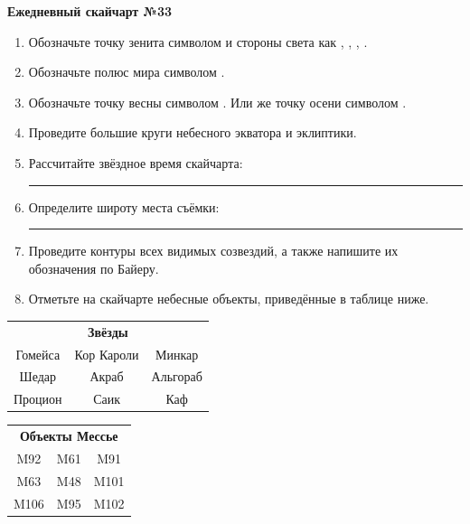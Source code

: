 \documentclass{./SAS-class-skygen}
\begin{document}
    
    
    
	\begin{center}
		\large\textbf{Ежедневный скайчарт №33}
	\end{center}

	\begin{enumerate}
		\item Обозначьте точку зенита символом  и стороны света как , , , .
		\item Обозначьте полюс мира символом .
		\item Обозначьте точку весны символом \Aries. Или же точку осени символом \Libra.
		\item Проведите большие круги небесного экватора и эклиптики.
		\item Рассчитайте звёздное время скайчарта: \rule{2cm}{0.4pt}
		\item Определите широту места съёмки: \rule{2cm}{0.4pt}
		\item Проведите контуры всех видимых созвездий, а также напишите их обозначения по Байеру.
		\item Отметьте на скайчарте небесные объекты, приведённые в таблице ниже.
	\end{enumerate}
	
    \vspace{0.5cm}

    \begin{table}[h!]
    \centering
    \begin{tabular}{ccc}
    \multicolumn{3}{c}{\textbf{Звёзды}} \\ Гомейса & Кор Кароли & Минкар \\
Шедар & Акраб & Альгораб \\
Процион & Саик & Каф \\

\end{tabular}
    \hfill
    \begin{tabular}{ccc}
    \multicolumn{3}{c}{\textbf{Объекты Мессье}} \\ M92 & M61 & M91 \\
M63 & M48 & M101 \\
M106 & M95 & M102 \\

\end{tabular}
    \end{table}
	
\end{document}
